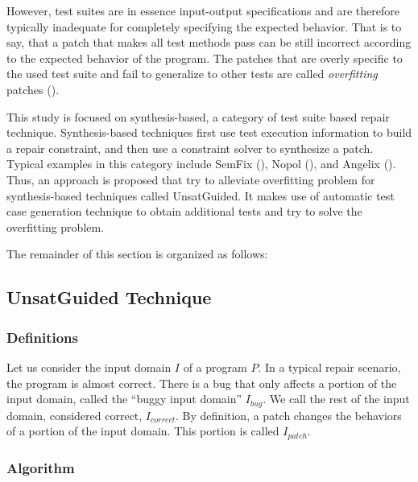 However, test suites are in essence input-output specifications and are therefore typically inadequate for completely specifying the expected behavior.
That is to say, that a patch that makes all test methods pass can be still incorrect according to the expected behavior of the program.
The patches that are overly specific to the used test suite and fail to generalize to other tests are called \emph{overfitting} patches (\cite{smith2015cure}).

This study is focused on synthesis-based, a category of test suite based repair technique.
Synthesis-based techniques first use test execution information to build a repair constraint, and then use a constraint solver to synthesize a patch. 
Typical examples in this category include SemFix (\cite{semfix}), Nopol (\cite{nopol}), and Angelix (\cite{Mechtaev:2016:ASM:2884781.2884807}).
Thus, an approach is proposed that try to alleviate overfitting problem for synthesis-based techniques called UnsatGuided.
It makes use of automatic test case generation technique to obtain additional tests and try to solve the overfitting problem.

The remainder of this section is organized as follows:

\subsection{UnsatGuided Technique}
\label{subsec:transversal-contributions:test-for-repair:definitions}

\subsubsection{Definitions}
\label{subsubsec:transversal-contributions:test-for-repair:unsat-guided:definitions}

Let us consider the input domain $I$ of a program $P$.
In a typical repair scenario, the program is almost correct.
There is a bug that only affects a portion of the input domain, called the ``buggy input domain'' $I_{bug}$.
We call the rest of the input domain, considered correct, $I_{correct}$. 
By definition, a patch changes the behaviors of a portion of the input domain.
This portion is called $I_{patch}$.

\subsubsection{Algorithm}
\label{subsubsec:transversal-contributions:test-for-repair:unsat-guided:algo}

